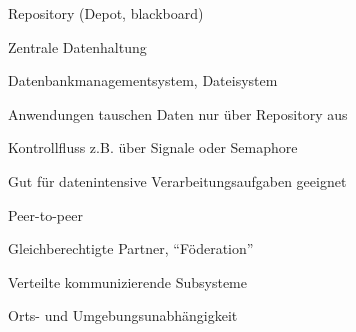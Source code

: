 \documentclass[a4paper]{article}
\begin{document}
\begin{multicols}{3}
  Repository (Depot, blackboard)
  \begin{itemize*}
    \item Zentrale Datenhaltung
          \begin{itemize*}
            \item Datenbankmanagementsystem, Dateisystem
          \end{itemize*}
    \item Anwendungen tauschen Daten nur über Repository aus
    \item Kontrollfluss z.B. über Signale oder Semaphore
    \item Gut für datenintensive Verarbeitungsaufgaben geeignet
  \end{itemize*}

  Peer-to-peer
  \begin{itemize*}
    \item Gleichberechtigte Partner, “Föderation”
    \item Verteilte kommunizierende Subsysteme
    \item Orts- und Umgebungsunabhängigkeit
  \end{itemize*}


\end{multicols}
\end{document}

